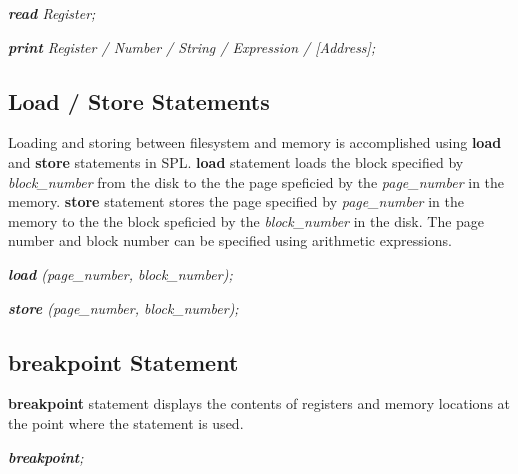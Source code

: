\documentclass[11pt]{article}
\begin{document}
   \textit{\textbf{read} Register;} 
   
   \textit{\textbf{print} Register / Number / String / Expression / [Address];}

\subsection{Load / Store Statements}
Loading and storing between filesystem and memory is accomplished using \textbf{load} and \textbf{store} statements in SPL. \textbf{load} statement loads the block specified by \textit{block\_number} from the disk to the the page speficied by the \textit{page\_number} in the memory. \textbf{store} statement stores the page specified by \textit{page\_number} in the memory to the the block speficied by the \textit{block\_number} in the disk. The page number and block number can be specified using arithmetic expressions.

\textit{\textbf{load} (page\_number, block\_number);}

\textit{\textbf{store} (page\_number, block\_number);}

\subsection{breakpoint Statement}
\textbf{breakpoint} statement displays the contents of registers and memory locations at the point where the statement is used. 

\textit{\textbf{breakpoint};}
\end{document}
